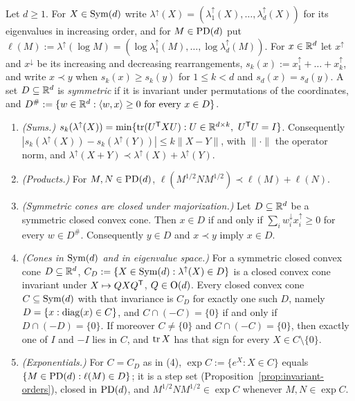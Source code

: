 \begin{lemma}\label{lem:spectral-cones}
Let $d \ge 1$. For $X \in \mathrm{Sym}(d)$ write $\lambda^\uparrow(X) = (\lambda^\uparrow_1(X), \dots,
\lambda^\uparrow_d(X))$ for its eigenvalues in increasing order, and for $M \in \mathrm{PD}(d)$ put
$\ell(M) := \lambda^\uparrow(\log M) = (\log\lambda^\uparrow_1(M), \dots, \log\lambda^\uparrow_d(M))$. For
$x \in \mathbb{R}^d$ let $x^\uparrow$ and $x^\downarrow$ be its increasing and decreasing rearrangements,
$s_k(x) := x^\uparrow_1 + \dots + x^\uparrow_k$, and write $x \prec y$ when $s_k(x) \ge s_k(y)$ for
$1 \le k < d$ and $s_d(x) = s_d(y)$. A set $D \subseteq \mathbb{R}^d$ is \emph{symmetric} if it is invariant
under permutations of the coordinates, and $D^\# := \{w \in \mathbb{R}^d : \langle w, x\rangle \ge 0 \text{ for
every } x \in D\}$.
\begin{enumerate}
\item \emph{(Sums.)} $s_k(\lambda^\uparrow(X)) = \min\{\operatorname{tr}(U^{\mathsf{T}}XU) : U \in \mathbb{R}^{d\times k},\
U^{\mathsf{T}}U = I\}$. Consequently $|s_k(\lambda^\uparrow(X)) - s_k(\lambda^\uparrow(Y))| \le k\|X - Y\|$, with
$\|\cdot\|$ the operator norm, and $\lambda^\uparrow(X + Y) \prec \lambda^\uparrow(X) + \lambda^\uparrow(Y)$.
\item \emph{(Products.)} For $M, N \in \mathrm{PD}(d)$, $\ell(M^{1/2}NM^{1/2}) \prec \ell(M) + \ell(N)$.
\item \emph{(Symmetric cones are closed under majorization.)} Let $D \subseteq \mathbb{R}^d$ be a symmetric
closed convex cone. Then $x \in D$ if and only if $\sum_iw^\downarrow_ix^\uparrow_i \ge 0$ for every
$w \in D^\#$. Consequently $y \in D$ and $x \prec y$ imply $x \in D$.
\item \emph{(Cones in $\mathrm{Sym}(d)$ and in eigenvalue space.)} For a symmetric closed convex cone
$D \subseteq \mathbb{R}^d$, $C_D := \{X \in \mathrm{Sym}(d) : \lambda^\uparrow(X) \in D\}$ is a closed convex cone
invariant under $X \mapsto QXQ^{\mathsf{T}}$, $Q \in \mathrm{O}(d)$. Every closed convex cone $C \subseteq \mathrm{Sym}(d)$
with that invariance is $C_D$ for exactly one such $D$, namely $D = \{x : \operatorname{diag}(x) \in C\}$, and
$C \cap (-C) = \{0\}$ if and only if $D \cap (-D) = \{0\}$. If moreover $C \ne \{0\}$ and
$C \cap (-C) = \{0\}$, then exactly one of $I$ and $-I$ lies in $C$, and $\operatorname{tr} X$ has that sign for
every $X \in C \setminus \{0\}$.
\item \emph{(Exponentials.)} For $C = C_D$ as in (4), $\exp C := \{e^X : X \in C\}$ equals
$\{M \in \mathrm{PD}(d) : \ell(M) \in D\}$; it is a step set (Proposition~\ref{prop:invariant-orders}), closed in $\mathrm{PD}(d)$,
and $M^{1/2}NM^{1/2} \in \exp C$ whenever $M, N \in \exp C$.
\end{enumerate}
\end{lemma}

